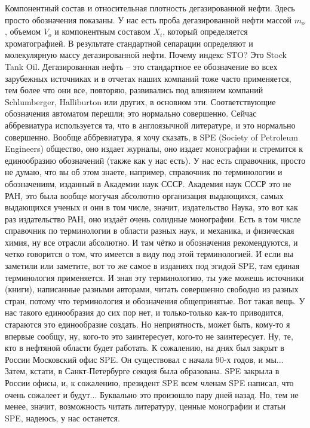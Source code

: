 \documentclass[main.tex]{subfiles}
\begin{document}
Компонентный состав и относительная плотность дегазированной нефти.
Здесь просто обозначения показаны.
У нас есть проба дегазированной нефти массой $m_o$, объемом $V_o$ и компонентным составом $X_i$, который определяется хроматографией.
В результате стандартной сепарации определяют и молекулярную массу дегазированной нефти.
Почему индекс STO? Это Stock Tank Oil.
Дегазированная нефть -- это стандартное ее обозначение во всех зарубежных источниках и в отчетах наших компаний тоже часто применяется, тем более что они все, повторяю, развивались под влиянием компаний Schlumberger, Halliburton или других, в основном эти.
Соответствующие обозначения автоматом перешли; это нормально совершенно.
Сейчас аббревиатура используется та, что в англоязычной литературе, и это нормально совершенно.
Вообще аббревиатура, я хочу сказать, в SPE (Society of Petroleum Engineers) общество, оно издает журналы, оно издает монографии и стремится к единообразию обозначений (также как у нас есть).
У нас есть справочник, просто не думаю, что вы об этом знаете, например, справочник по терминологии и обозначениям, изданный в Академии наук СССР.
Академия наук СССР это не РАН, это была вообще могучая абсолютно организация выдающихся, самых выдающихся ученых и они в том числе, значит, издательство Наука, это вот как раз издательство РАН, оно издаёт очень солидные монографии.
Есть в том числе справочник по терминологии в области разных наук, и механика, и физическая химия, ну все отрасли абсолютно.
И там чётко и обозначения рекомендуются, и четко говорится о том, что имеется в виду под этой терминологией.
И если вы заметили или заметите, вот то же самое в изданиях под эгидой SPE, там единая терминология применяется.
И зная эту терминологию, ты уже можешь источники (книги), написанные разными авторами, читать совершенно свободно из разных стран, потому что терминология и обозначения общепринятые.
Вот такая вещь.
У нас такого единообразия до сих пор нет, и только-только как-то приводится, стараются это единообразие создать.
Но неприятность, может быть, кому-то я впервые сообщу, ну, кого-то это заинтересует, кого-то не заинтересует.
Ну, те, кто в нефтяной области будет работать.
К сожалению, на днях был закрыт в России Московский офис SPE.
Он существовал с начала 90-х годов, и мы...
Затем, кстати, в Санкт-Петербурге секция была образована.
SPE закрыла в России офисы, и, к сожалению, президент SPE всем членам SPE написал, что очень сожалеет и будут...
Буквально это произошло пару дней назад.
Но, тем не менее, значит, возможность читать литературу, ценные монографии и статьи SPE, надеюсь, у нас останется.
\end{document}
